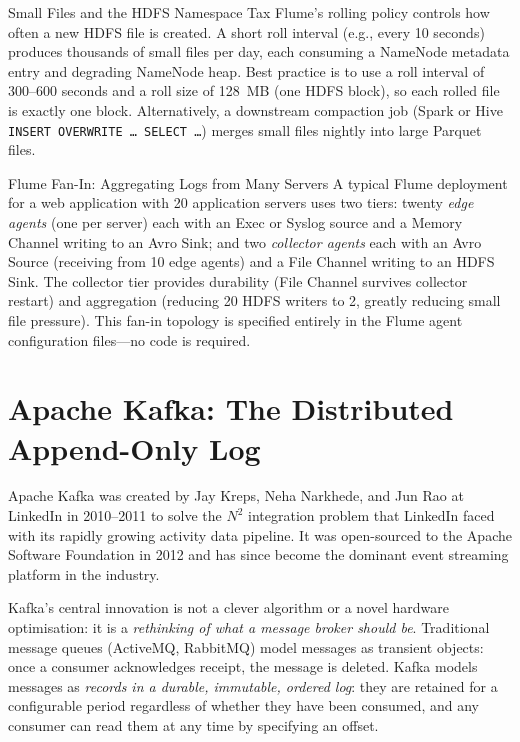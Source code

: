 \begin{caution}{Small Files and the HDFS Namespace Tax}
Flume's rolling policy controls how often a new HDFS file is created.
A short roll interval (e.g., every 10 seconds) produces thousands of
small files per day, each consuming a NameNode metadata entry and
degrading NameNode heap. Best practice is to use a roll interval of
300--600 seconds and a roll size of 128~MB (one HDFS block), so each
rolled file is exactly one block. Alternatively, a downstream compaction
job (Spark or Hive \texttt{INSERT OVERWRITE \ldots\ SELECT \ldots}) merges
small files nightly into large Parquet files.
\end{caution}

\begin{systemdesign}{Flume Fan-In: Aggregating Logs from Many Servers}
A typical Flume deployment for a web application with 20 application
servers uses two tiers: twenty \emph{edge agents} (one per server)
each with an Exec or Syslog source and a Memory Channel writing to
an Avro Sink; and two \emph{collector agents} each with an Avro Source
(receiving from 10 edge agents) and a File Channel writing to an HDFS
Sink. The collector tier provides durability (File Channel survives
collector restart) and aggregation (reducing 20 HDFS writers to 2,
greatly reducing small file pressure). This fan-in topology is specified
entirely in the Flume agent configuration files---no code is required.
\end{systemdesign}

\section{Apache Kafka: The Distributed Append-Only Log}
\label{sec:kafka}

Apache Kafka was created by Jay Kreps, Neha Narkhede, and Jun Rao at
LinkedIn in 2010--2011 to solve the $N^2$ integration problem that LinkedIn
faced with its rapidly growing activity data pipeline. It was open-sourced
to the Apache Software Foundation in 2012 and has since become the dominant
event streaming platform in the industry.

Kafka's central innovation is not a clever algorithm or a novel hardware
optimisation: it is a \emph{rethinking of what a message broker should be}.
Traditional message queues (ActiveMQ, RabbitMQ) model messages as transient
objects: once a consumer acknowledges receipt, the message is deleted.
Kafka models messages as \emph{records in a durable, immutable, ordered
log}: they are retained for a configurable period regardless of whether
they have been consumed, and any consumer can read them at any time by
specifying an offset.

